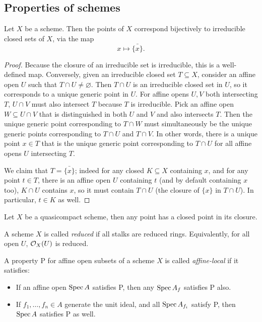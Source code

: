 \documentclass[11pt]{amsart}
\begin{document}
\subsection{Properties of schemes}

\begin{prop}
Let $X$ be a scheme. Then the points of $X$ correspond bijectively to irreducible closed sets of $X$, via the map
\[x \mapsto \bar{\{x\}}.\]
\end{prop}

\begin{proof}
Because the closure of an irreducible set is irreducible, this is a well-defined map. Conversely, given an irreducible closed set $T\subseteq X$, consider an affine open $U$ such that $T\cap U \neq \varnothing$. Then $T\cap U$ is an irreducible closed set in $U$, so it corresponds to a unique generic point in $U$. For affine opens $U,V$ both intersecting $T$, $U\cap V$ must also intersect $T$ because $T$ is irreducible. Pick an affine open $W\subseteq U\cap V$ that is distinguished in both $U$ and $V$ and also intersects $T$. Then the unique generic point corresponding to $T\cap W$ must simultaneously be the unique generic points corresponding to $T\cap U$ and $T\cap V$. In other words, there is a unique point $x\in T$ that is the unique generic point corresponding to $T\cap U$ for all affine opens $U$ intersecting $T$. 

We claim that $T = \bar{\{x\}}$; indeed for any closed $K\subseteq X$ containing $x$, and for any point $t\in T$, there is an affine open $U$ containing $t$ (and by default containing $x$ too), $K\cap U$ contains $x$, so it must contain $T\cap U$ (the closure of $\{x\}$ in $T\cap U$). In particular, $t\in K$ as well. 
\end{proof}

\begin{prop}
Let $X$ be a quasicompact scheme, then any point has a closed point in its closure.
\end{prop}

\begin{defn}
A scheme $X$ is called \emph{reduced} if all stalks are reduced rings. Equivalently, for all open $U$, $\mathcal{O}_X(U)$ is reduced.
\end{defn}


\begin{defn}
A property P for affine open subsets of a scheme $X$ is called \emph{affine-local} if it satisfies:
\begin{itemize}
    \item If an affine open $\operatorname{Spec} A$ satisfies P, then any $\operatorname{Spec} A_f$ satisfies P also.
    \item If $f_1,\dots,f_n\in A$ generate the unit ideal, and all $\operatorname{Spec} A_{f_i}$ satisfy P, then $\operatorname{Spec} A$ satisfies P as well.
\end{itemize}
\end{defn}
\end{document}
